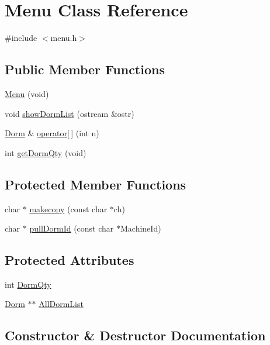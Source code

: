 \hypertarget{classMenu}{}\section{Menu Class Reference}
\label{classMenu}


{\ttfamily \#include $<$menu.\+h$>$}

\subsection*{Public Member Functions}
\begin{DoxyCompactItemize}
\item 
\hyperlink{classMenu_a0c1481a62f6b0bf63a506d2622f2244f}{Menu} (void)
\item 
void \hyperlink{classMenu_afb39c20804f4f50787c99ca416e4b92f}{show\+Dorm\+List} (ostream \&ostr)
\item 
\hyperlink{classDorm}{Dorm} \& \hyperlink{classMenu_a06939a393f444b69994608b6bbcf3a22}{operator\mbox{[}$\,$\mbox{]}} (int n)
\item 
int \hyperlink{classMenu_ae4014d4d44394bd61e635aeee6b7531b}{get\+Dorm\+Qty} (void)
\end{DoxyCompactItemize}
\subsection*{Protected Member Functions}
\begin{DoxyCompactItemize}
\item 
char $\ast$ \hyperlink{classMenu_a9a3436ae4e0a14be7089401f95a744f7}{makecopy} (const char $\ast$ch)
\item 
char $\ast$ \hyperlink{classMenu_abe606f4e72a307c59981dd44105b37ce}{pull\+Dorm\+Id} (const char $\ast$Machine\+Id)
\end{DoxyCompactItemize}
\subsection*{Protected Attributes}
\begin{DoxyCompactItemize}
\item 
int \hyperlink{classMenu_aa39029772c677e7117aff6ba6f9251aa}{Dorm\+Qty}
\item 
\hyperlink{classDorm}{Dorm} $\ast$$\ast$ \hyperlink{classMenu_a20f246a970fbd30dd0d38a8b5ab7c6a9}{All\+Dorm\+List}
\end{DoxyCompactItemize}


\subsection{Constructor \& Destructor Documentation}
\hypertarget{classMenu_a0c1481a62f6b0bf63a506d2622f2244f}{}
